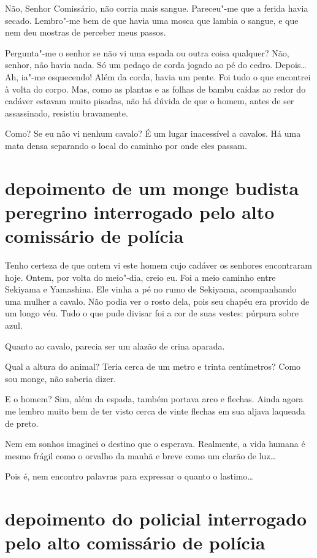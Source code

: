  Não, Senhor Comissário, não corria mais sangue. Pareceu"-me que a ferida
havia secado. Lembro"-me bem de que havia uma mosca que lambia o sangue,
e que nem deu mostras de perceber meus passos.

Pergunta"-me o senhor se não vi uma espada ou outra coisa qualquer? Não,
senhor, não havia nada. Só um pedaço de corda jogado ao pé do cedro.
Depois\ldots{} Ah, ia"-me esquecendo! Além da corda, havia um pente. Foi tudo
o que encontrei à volta do corpo. Mas, como as plantas e as folhas de
bambu caídas ao redor do cadáver estavam muito pisadas, não há dúvida
de que o homem, antes de ser assassinado, resistiu bravamente. 

Como? Se eu não vi nenhum cavalo? É um lugar inacessível a cavalos. Há
uma mata densa separando o local do caminho por onde eles passam.

\section*{depoimento de um monge budista peregrino interrogado pelo alto
comissário de polícia}

Tenho certeza de que ontem vi este homem cujo cadáver os senhores
encontraram hoje. Ontem, por volta do meio"-dia, creio eu. Foi a meio
caminho entre Sekiyama e Yamashina. Ele vinha a pé no rumo de Sekiyama,
acompanhando uma mulher a cavalo. Não podia ver o rosto dela, pois seu
chapéu era provido de um longo véu. Tudo o que pude divisar foi a cor
de suas vestes: púrpura sobre azul. 

Quanto ao cavalo, parecia ser um alazão de crina aparada.

Qual a altura do animal? Teria cerca de um metro e trinta centímetros?
Como sou monge, não saberia dizer.

E o homem? Sim, além da espada, também portava arco e flechas. Ainda
agora me lembro muito bem de ter visto cerca de vinte flechas em sua
aljava laqueada de preto.

Nem em sonhos imaginei o destino que o esperava. Realmente, a vida
humana é mesmo frágil como o orvalho da manhã e breve como um clarão de
luz\ldots{} 

Pois é, nem encontro palavras para expressar o quanto o lastimo\ldots{}

\section*{depoimento do policial interrogado pelo alto comissário de polícia}

